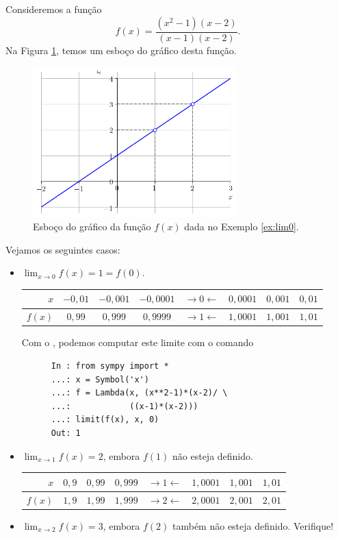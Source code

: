 \begin{ex}\label{ex:lim0}
  Consideremos a função
  \begin{equation}
    f(x) = \frac{(x^2-1)(x-2)}{(x-1)(x-2)}.
  \end{equation}
  Na Figura \ref{fig:ex_lim0}, temos um esboço do gráfico desta função.

  \begin{figure}[H]
    \centering
    \includegraphics[width=0.7\textwidth]{./cap_lim/dados/fig_ex_lim0/fig_ex_lim0}
    \caption{Esboço do gráfico da função $f(x)$ dada no Exemplo \ref{ex:lim0}.}
    \label{fig:ex_lim0}
  \end{figure}


  Vejamos os seguintes casos:
  \begin{itemize}
  \item $\displaystyle \lim_{x\to 0} f(x) = 1 = f(0)$.
    
    \begin{tabular}{r|ccc|c|ccc}
      $x$ & $-0,01$ & $-0,001$ & $-0,0001$ & $\rightarrow 0 \leftarrow$ & $0,0001$ & $0,001$ & $0,01$\\\hline
      $f(x)$ & $0,99$ & $0,999$ & $0,9999$ & $\rightarrow 1 \leftarrow$ & $1,0001$ & $1,001$ & $1,01$
    \end{tabular}

    \ifispython
    Com o {\sympy}, podemos computar este limite com o comando
    \begin{lstlisting}
      In : from sympy import *
      ...: x = Symbol('x')
      ...: f = Lambda(x, (x**2-1)*(x-2)/ \
      ...:            ((x-1)*(x-2)))
      ...: limit(f(x), x, 0)
      Out: 1
    \end{lstlisting}
    \fi
  \item $\displaystyle \lim_{x\to 1} f(x) = 2$, embora $f(1)$ não esteja definido.
    
    \begin{tabular}{r|ccc|c|ccc}
      $x$ & $0,9$ & $0,99$ & $0,999$ & $\rightarrow 1 \leftarrow$ & $1,0001$ & $1,001$ & $1,01$\\\hline
      $f(x)$ & $1,9$ & $1,99$ & $1,999$ & $\rightarrow 2 \leftarrow$ & $2,0001$ & $2,001$ & $2,01$
    \end{tabular}
  \item $\displaystyle \lim_{x\to 2} f(x) = 3$, embora $f(2)$ também não esteja definido. Verifique!
  \end{itemize}
\end{ex}

